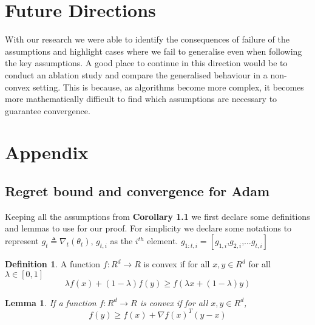 \documentclass[nohyperref]{article}
\theoremstyle{plain}
\newtheorem{lemma}[theorem]{Lemma}
\theoremstyle{definition}
\newtheorem{definition}[theorem]{Definition}
\theoremstyle{remark}
\begin{document}
\section{Future Directions}
With our research we were able to identify the consequences of failure of the assumptions and highlight cases where we fail to generalise even when following the key assumptions. A good place to continue in this direction would be to conduct an ablation study and compare the generalised behaviour in a non-convex setting. This is because, as algorithms become more complex, it becomes more mathematically difficult to find which assumptions are necessary to guarantee convergence.\\

\nocite{Ruder16}




\newpage
\appendix
\onecolumn
\section{Appendix}

\subsection{Regret bound and convergence for Adam}
Keeping all the assumptions from \textbf{Corollary 1.1} we first declare some definitions and lemmas to use for our proof. For simplicity we declare some notations to represent $g_{t}  \triangleq  \nabla_{t}(\theta_{t})$, $g_{t,i}$ as the $i^{th}$ element. $g_{1:t,i} = [g_{1,i} \textbf{,} g_{2,i} \textbf{,} \ldots g_{t,i} ]$ \cite{Kingma14} \\

\begin{definition}
\label{def:inj}
A function $f: R^d \to R$ is convex if for all $x,y\in R^d$ for all $\lambda \in [0,1]$
$$\lambda f(x) + (1- \lambda)f(y) \geq f(\lambda x + (1- \lambda)y)$$
\end{definition}

\begin{lemma}
\label{lem:usefullemma}
If a function $f: R^d \to R$ is convex if for all $x,y\in R^d$,
$$f(y) \geq f(x) + \nabla f(x)^{T}(y-x)  $$
\end{lemma}
\end{document}
